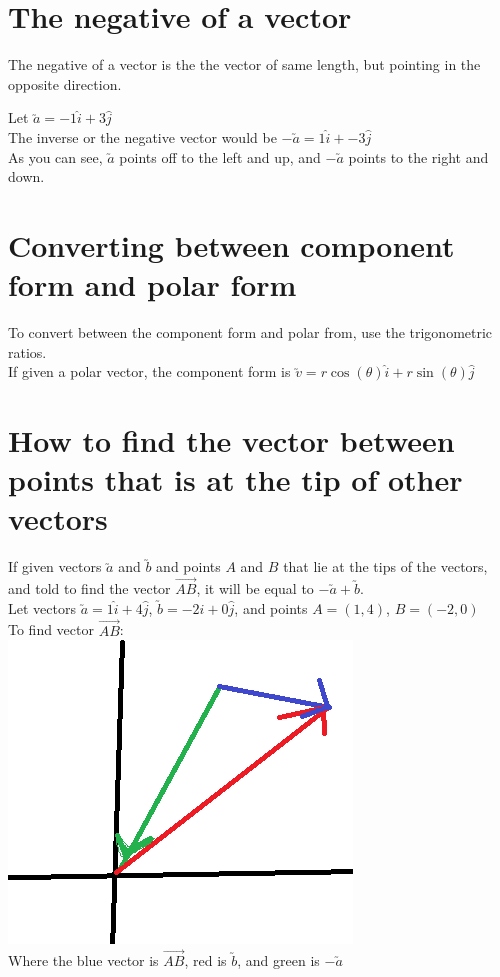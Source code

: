 \documentclass{book}
\begin{document}
\section{The negative of a vector}
The negative of a vector is the the vector of same length, but pointing in the opposite direction.

Let $\utilde{a} = -1\hat{i} + 3\hat{j}$\\
The inverse or the negative vector would be $-\utilde{a} = 1\hat{i} + -3\hat{j}$\\
As you can see, $\utilde{a}$ points off to the left and up, and $-\utilde{a}$ points to the right and down.


\section{Converting between component form and polar form}
To convert between the component form and polar from, use the trigonometric ratios.\\
If given a polar vector, the component form is $\utilde{v} = r\cos(\theta)\hat{i} + r\sin(\theta)\hat{j}$

\section{How to find the vector between points that is at the tip of other vectors}
If given vectors $\utilde{a}$ and $\utilde{b}$ and points $A$ and $B$ that lie at the tips of the vectors, and told to find the vector $\Vec{AB}$, it will be equal to $-\utilde{a} + \utilde{b}$.\\

Let vectors $\utilde{a} = 1\hat{i} + 4\hat{j}$, $\utilde{b} = -2\hat{i} + 0\hat{j}$, and points $A = (1, 4)$, $B = (-2, 0)$\\
To find vector $\Vec{AB}$:\\
\includegraphics[scale=0.5]{VecAB}\\
Where the blue vector is $\Vec{AB}$, red is $\utilde{b}$, and green is $-\utilde{a}$
\end{document}
